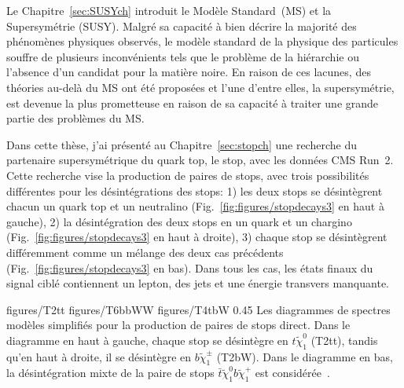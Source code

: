 Le Chapitre~\ref{sec:SUSYch} introduit le Modèle Standard~(MS) et la Supersymétrie (SUSY). Malgré sa capacité à bien décrire la majorité des phénomènes physiques observés, le modèle standard de la physique des particules souffre de plusieurs inconvénients tels que le problème de la hiérarchie ou l’absence d’un candidat pour la matière noire. En raison de ces lacunes, des théories au-delà du MS ont été proposées et l'une d'entre elles, la supersymétrie, est devenue la plus prometteuse en raison de sa capacité à traiter une grande partie des problèmes du MS. 

Dans cette thèse, j'ai présenté au Chapitre~\ref{sec:stopch} une recherche du partenaire supersymétrique du quark top, le stop, avec les données CMS Run~2. Cette recherche vise la production de paires de stops, avec trois possibilités différentes pour les désintégrations des stops: 1) les deux stops se désintègrent chacun un quark top et un neutralino (Fig.~\ref{fig:figures/stopdecays3} en haut à gauche), 2) la désintégration des deux stops en un quark et un chargino (Fig.~\ref{fig:figures/stopdecays3} en haut à droite), 3) chaque stop se désintègrent différemment comme un mélange des deux cas précédents (Fig.~\ref{fig:figures/stopdecays3} en bas). Dans tous les cas, les états finaux du signal ciblé contiennent un lepton, des jets et une énergie transvers manquante.

                 {figures/T2tt} %
                 {figures/T6bbWW} %
                 {figures/T4tbW}
                 {0.45}       %
                 { Les diagrammes de spectres modèles simplifiés pour la production de paires de stops direct. Dans le diagramme en haut à gauche, chaque stop se désintègre en $t  \tilde{\chi}^{0}_{1}$ (T2tt), tandis qu'en haut à droite, il se désintègre en $ b \tilde{\chi}^{\pm}_{1} $ (T2bW). Dans le diagramme en bas, la désintégration mixte de la paire de stops $\bar{t} \tilde{\chi}^{0}_{1} b \tilde{\chi}^{+}_{1}$ est considérée~\cite{website:SUSYdiagrams}. }




